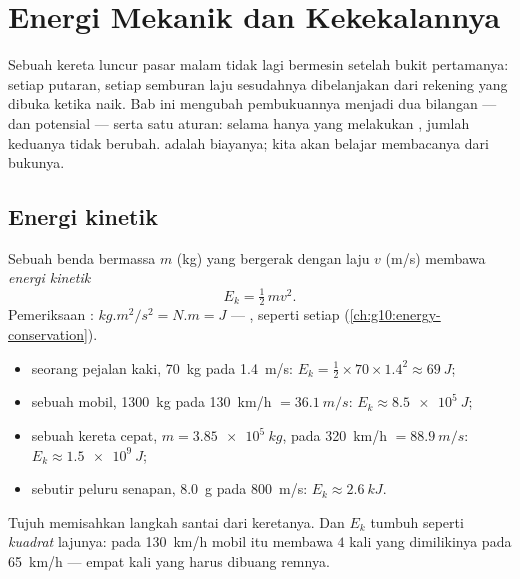 \chapter{Energi Mekanik dan Kekekalannya}\label{ch:g11:mechanical-energy}

Sebuah kereta luncur pasar malam tidak lagi bermesin setelah bukit
pertamanya: setiap putaran, setiap semburan laju sesudahnya dibelanjakan
dari rekening yang dibuka ketika naik. Bab ini mengubah pembukuannya
menjadi dua bilangan ---  dan  potensial --- serta
satu aturan: selama hanya  yang melakukan , jumlah keduanya
tidak berubah.  adalah biayanya; kita akan belajar membacanya
dari bukunya.

\section{Energi kinetik}

\begin{definition}\label{def:g11:mechanical-energy:kinetic}
Sebuah benda bermassa $m$ (\unit{kg}) yang bergerak dengan laju $v$
(\unit{m/s}) membawa \emph{energi kinetik}
\[
E_k = \tfrac12\, m v^2 .
\]
Pemeriksaan : $\unit{kg.m^2/s^2} = \unit{N.m} = \unit{J}$ ---
, seperti setiap  (\cref{ch:g10:energy-conservation}).
\end{definition}

\begin{example}\label{ex:g11:mechanical-energy:orders}
\begin{itemize}
  \item seorang pejalan kaki, \qty{70}{kg} pada \qty{1.4}{m/s}:
        $E_k = \tfrac12 \times 70 \times 1.4^2 \approx \qty{69}{J}$;
  \item sebuah mobil, \qty{1300}{kg} pada \qty{130}{km/h} $= \qty{36.1}{m/s}$: $E_k \approx \qty{8.5e5}{J}$;
  \item sebuah kereta cepat, $m = \qty{3.85e5}{kg}$, pada
        \qty{320}{km/h} $= \qty{88.9}{m/s}$:
        $E_k \approx \qty{1.5e9}{J}$;
  \item sebutir peluru senapan, \qty{8.0}{g} pada \qty{800}{m/s}:
        $E_k \approx \qty{2.6}{kJ}$.
\end{itemize}
Tujuh  memisahkan langkah santai dari keretanya. Dan $E_k$
tumbuh seperti \emph{kuadrat} lajunya: pada \qty{130}{km/h} mobil itu
membawa $4$ kali  yang dimilikinya pada \qty{65}{km/h} --- empat
kali yang harus dibuang remnya.
\end{example}

